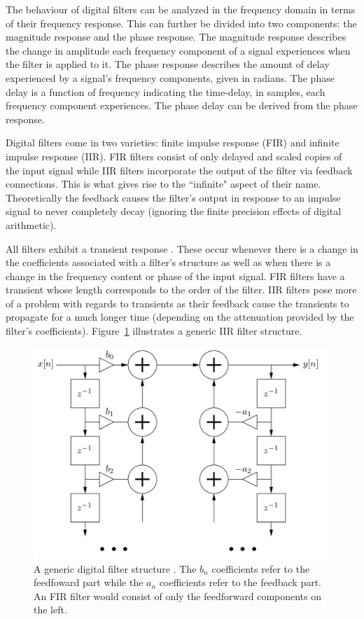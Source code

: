\documentclass[main.tex]{subfiles}
\begin{document}
The behaviour of digital filters can be analyzed in the frequency domain in terms of their frequency response. This can further be divided into two components: the magnitude response and the phase response. The magnitude response describes the change in amplitude each frequency component of a signal experiences when the filter is applied to it. The phase response describes the amount of delay experienced by a signal's frequency components, given in radians. The phase delay is a function of frequency indicating the time-delay, in samples, each frequency component experiences. The phase delay can be derived from the phase response.

Digital filters come in two varieties: finite impulse response (FIR) and infinite impulse response (IIR). FIR filters consist of only delayed and scaled copies of the input signal while IIR filters incorporate the output of the filter via feedback connections. This is what gives rise to the ``infinite" aspect of their name. Theoretically the feedback causes the filter's output in response to an impulse signal to never completely decay (ignoring the finite precision effects of digital arithmetic).

All filters exhibit a transient response . These occur whenever there is a change in the coefficients associated with a filter's structure as well as when there is a change in the frequency content or phase of the input signal. FIR filters have a transient whose length corresponds to the order of the filter. IIR filters pose more of a problem with regards to transients as their feedback cause the transients to propagate for a much longer time (depending on the attenuation provided by the filter's coefficients). Figure~\ref{fig:generic_IIR} illustrates a generic IIR filter structure.

\begin{figure}[h!]
    \centering
    \includegraphics[scale=.30]{./images/diagrams/digitalFilter.png}
    \caption{A generic digital filter structure . The $b_n$ coefficients refer to the feedfoward part while the $a_n$ coefficients refer to the feedback part. An FIR filter would consist of only the feedforward components on the left.}
    \label{fig:generic_IIR}
\end{figure}
\end{document}
